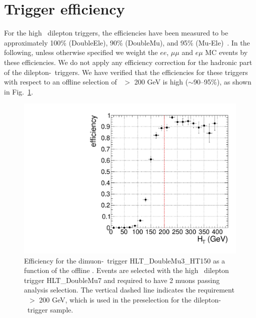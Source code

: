 \section{Trigger efficiency}
\label{sec:trgEff}

For the high \pt\ dilepton triggers, the efficiencies have been measured to be approximately
100\% (DoubleEle), 90\% (DoubleMu), and 95\% (Mu-Ele)~\cite{ref:HWW}. 
In the following, unless otherwise specified we weight the $ee$, $\mu\mu$ and $e\mu$ MC events 
by these efficiencies. We do not apply any efficiency correction for the hadronic 
part of the dilepton-\Ht\ triggers. We have verified that the efficiencies for these triggers
with respect to an offline selection of \Ht\ $>$ 200 GeV is high ($\sim$90--95\%), 
as shown in Fig.~\ref{fig:httrig}.

\begin{figure}[tbh]
\begin{center}
\includegraphics[width=0.6\linewidth]{plots/mmht.pdf}
\caption{\label{fig:httrig}\protect
Efficiency for the dimuon-\Ht\ trigger HLT\_DoubleMu3\_HT150
as a function of the offline \Ht. Events are selected with the high \pt\ dilepton trigger
HLT\_DoubleMu7 and required to have 2 muons passing analysis selection.
The vertical dashed line indicates the requirement \Ht\ $>$ 200 GeV, which is used in the
preselection for the dilepton-\Ht\ trigger sample.
}
\end{center}
\end{figure}



